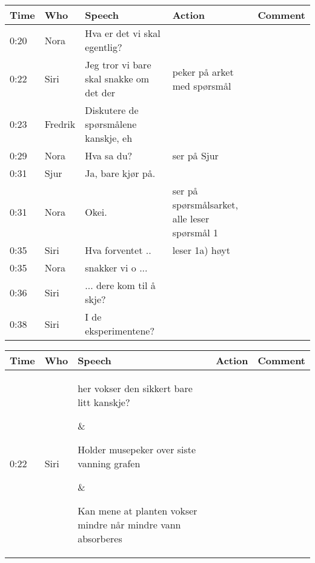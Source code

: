 
\def\arraystretch{2.2}
\begin{table}
\begin{adjustwidth}{-4em}{-4em}
\begin{tabular}{@{}l l p{5cm} p{4cm} p{.5cm}@{}} \toprule

    
    Time            & Who & Speech & Action & Comment \\ \midrule        

    0:20 &	Nora	& Hva er det vi skal egentlig?		\\
0:22	&	Siri	& Jeg tror vi bare skal snakke om det der &	peker på arket med spørsmål	\\
0:23 &	Fredrik	& Diskutere de spørsmålene kanskje, eh		\\
0:29 &	Nora	& Hva sa du?	& ser på Sjur	\\
0:31 &	Sjur	& Ja, bare kjør på.		\\
0:31 &	Nora	& Okei. &	ser på spørsmålsarket, alle leser spørsmål 1	\\
0:35 &	Siri	& Hva forventet .. &	leser 1a) høyt	\\
0:35 &	Nora	& snakker vi o ...		\\
0:36 &	Siri	& ... dere kom til å skje?		\\
0:38 &	Siri	& I de eksperimentene?		\\                                                                                  
   
    \bottomrule
    
\end{tabular}
\end{adjustwidth}
\end{table}

\def\arraystretch{2.2}
\begin{table}
	\begin{adjustwidth}{-4em}{-4em}
	\begin{center}
	\begin{tabular}{l l p{5cm} p{4cm} p{4cm}} \toprule
			Time &  Who &  Speech  & Action & Comment \\ \midrule  
		

			0:22 %
			& 
			Siri %
			& 
			\parbox[t]{5cm}{
			\raggedright
				her vokser den sikkert bare litt kanskje? %
			}
			& 
			\parbox[t]{4cm}{
			\raggedright
				Holder musepeker over siste vanning grafen %

			}		
			& 
			\parbox[t]{4cm}{
			\raggedright
				Kan mene at planten vokser mindre når mindre vann absorberes %


			}		
			\\ 

			
		\bottomrule
	\end{tabular}
\end{center}
\end{adjustwidth}
\end{table}

	